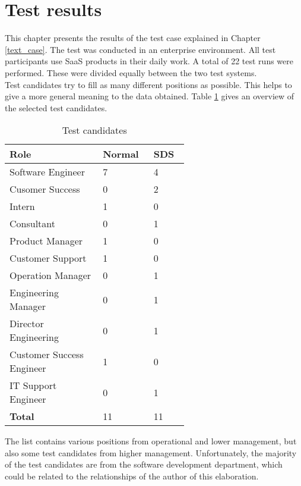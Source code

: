\newpage
\section{Test results}\label{test_results}
This chapter presents the results of the test case explained in Chapter \ref{text_case}. The test was conducted in an enterprise environment. All test participants use \ac{SaaS} products in their daily work. A total of 22 test runs were performed. These were divided equally between the two test systems. \\
Test candidates try to fill as many different positions as possible. This helps to give a more general meaning to the data obtained. Table \ref{tab:test_candidates} gives an overview of the selected test candidates. \\
\begin{table}[ht]
    \centering
    \begin{tabular}{|p{0.4\linewidth} | p{0.1\linewidth}|p{0.1\linewidth}|}
        \hline
        \textbf{Role} &\textbf{Normal}&\textbf{\ac{SDS}} \\ \hline
        Software Engineer & 7 & 4 \\ \hline
        Cusomer Success & 0 & 2 \\ \hline
        Intern & 1 & 0 \\ \hline
        Consultant & 0 & 1 \\ \hline
        Product Manager & 1 & 0 \\ \hline
        Customer Support & 1 & 0 \\ \hline
        Operation Manager & 0 & 1 \\ \hline
        Engineering Manager & 0 & 1 \\ \hline
        Director Engineering & 0 & 1 \\ \hline
        Customer Success Engineer & 1 & 0 \\ \hline
        IT Support Engineer & 0 & 1 \\ \hline \hline
        \textbf{Total} & 11 & 11 \\ \hline
    \end{tabular}
    \caption{\label{tab:test_candidates} Test candidates}
\end{table}

The list contains various positions from operational and lower management, but also some test candidates from higher management. Unfortunately, the majority of the test candidates are from the software development department, which could be related to the relationships of the author of this elaboration. \\



% 
